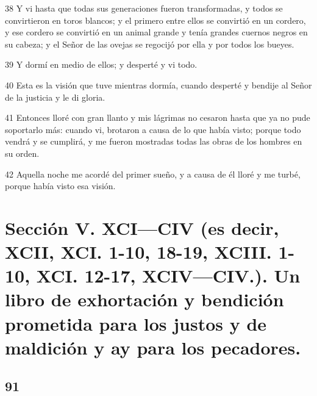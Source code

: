 \par 38 Y vi hasta que todas sus generaciones fueron transformadas, y todos se convirtieron en toros blancos; y el primero entre ellos se convirtió en un cordero, y ese cordero se convirtió en un animal grande y tenía grandes cuernos negros en su cabeza; y el Señor de las ovejas se regocijó por ella y por todos los bueyes.
\par 39 Y dormí en medio de ellos; y desperté y vi todo.
\par 40 Esta es la visión que tuve mientras dormía, cuando desperté y bendije al Señor de la justicia y le di gloria.
\par 41 Entonces lloré con gran llanto y mis lágrimas no cesaron hasta que ya no pude soportarlo más: cuando vi, brotaron a causa de lo que había visto; porque todo vendrá y se cumplirá, y me fueron mostradas todas las obras de los hombres en su orden.
\par 42 Aquella noche me acordé del primer sueño, y a causa de él lloré y me turbé, porque había visto esa visión.

\part {Sección V. XCI—CIV (es decir, XCII, XCI. 1-10, 18-19, XCIII. 1-10, XCI. 12-17, XCIV—CIV.). Un libro de exhortación y bendición prometida para los justos y de maldición y ay para los pecadores.}

\chapter{91}

